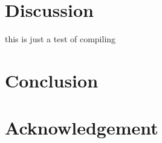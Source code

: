 \documentclass[10pt, conference, compsocconf]{IEEEtran}
\begin{document}








\section{Discussion}
this is just a test of compiling 






\section{Conclusion}

\section*{Acknowledgement}



\end{document}
